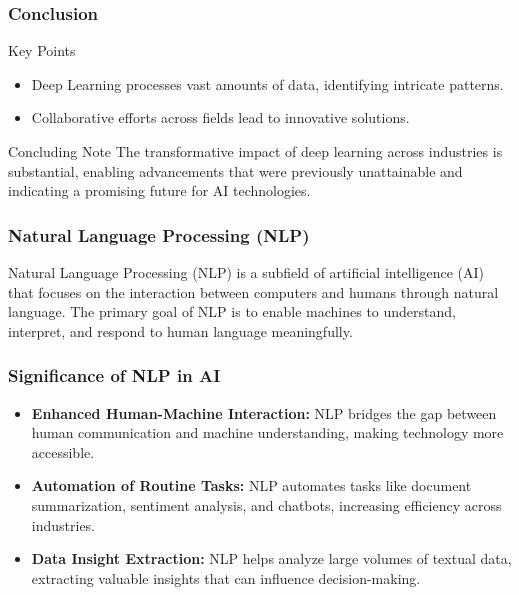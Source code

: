 \documentclass{beamer}
\begin{document}
\begin{frame}[fragile]
    \frametitle{Conclusion}
    \begin{block}{Key Points}
        \begin{itemize}
            \item Deep Learning processes vast amounts of data, identifying intricate patterns.
            \item Collaborative efforts across fields lead to innovative solutions.
        \end{itemize}
    \end{block}
    
    \begin{block}{Concluding Note}
        The transformative impact of deep learning across industries is substantial, enabling advancements that were previously unattainable and indicating a promising future for AI technologies.
    \end{block}
\end{frame}

\begin{frame}[fragile]
    \frametitle{Natural Language Processing (NLP)}
    Natural Language Processing (NLP) is a subfield of artificial intelligence (AI) that focuses on the interaction between computers and humans through natural language. 
    The primary goal of NLP is to enable machines to understand, interpret, and respond to human language meaningfully.
\end{frame}

\begin{frame}[fragile]
    \frametitle{Significance of NLP in AI}
    \begin{itemize}
        \item \textbf{Enhanced Human-Machine Interaction:} 
        NLP bridges the gap between human communication and machine understanding, making technology more accessible.
        
        \item \textbf{Automation of Routine Tasks:} 
        NLP automates tasks like document summarization, sentiment analysis, and chatbots, increasing efficiency across industries.
        
        \item \textbf{Data Insight Extraction:} 
        NLP helps analyze large volumes of textual data, extracting valuable insights that can influence decision-making.
    \end{itemize}
\end{frame}
\end{document}
